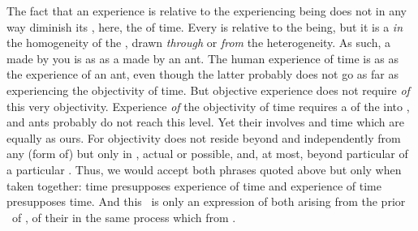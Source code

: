 The fact that an experience is relative to the experiencing being does not in
any way diminish its , here, the  of time.
Every  is relative to the  being, but it is a
 {\em in} the homogeneity of the , drawn {\em
  through} or {\em from} the  heterogeneity.  As such, a
 made by you is as  as a  made by
an ant.  The human experience of time is as  as the experience of
an ant, even though the latter probably does not go as far as experiencing the
{objectivity} of time.  But objective experience does not require  {\em of} this very objectivity. Experience {\em of} the
{objectivity} of time requires a  of the
 into , and ants probably do not reach this
level.  Yet their  involves  and time which are
equally  as ours. For objectivity does not reside beyond and
independently from any (form of)  but only in ,
actual or possible, and, at most, beyond particular  of a
particular .  Thus, we would accept both phrases quoted above but
only when taken together: time presupposes experience of time and experience of
time presupposes time. And this \equin\ is only an expression of both
 arising from the prior \nexus\ of , of their
 in the same process which   from
.

